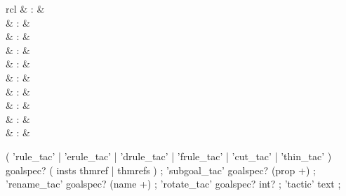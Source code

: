 \begin{isabellebody}
\begin{isamarkuptext}
  \begin{matharray}{rcl}
    \mbox{}\isa{{\isachardoublequote}\isactrlsup {\isacharasterisk}{\isachardoublequote}} & : & \isarmeth \\
    \mbox{}\isa{{\isachardoublequote}\isactrlsup {\isacharasterisk}{\isachardoublequote}} & : & \isarmeth \\
    \mbox{}\isa{{\isachardoublequote}\isactrlsup {\isacharasterisk}{\isachardoublequote}} & : & \isarmeth \\
    \mbox{}\isa{{\isachardoublequote}\isactrlsup {\isacharasterisk}{\isachardoublequote}} & : & \isarmeth \\
    \mbox{}\isa{{\isachardoublequote}\isactrlsup {\isacharasterisk}{\isachardoublequote}} & : & \isarmeth \\
    \mbox{}\isa{{\isachardoublequote}\isactrlsup {\isacharasterisk}{\isachardoublequote}} & : & \isarmeth \\
    \mbox{}\isa{{\isachardoublequote}\isactrlsup {\isacharasterisk}{\isachardoublequote}} & : & \isarmeth \\
    \mbox{}\isa{{\isachardoublequote}\isactrlsup {\isacharasterisk}{\isachardoublequote}} & : & \isarmeth \\
    \mbox{}\isa{{\isachardoublequote}\isactrlsup {\isacharasterisk}{\isachardoublequote}} & : & \isarmeth \\
    \mbox{}\isa{{\isachardoublequote}\isactrlsup {\isacharasterisk}{\isachardoublequote}} & : & \isarmeth \\
  \end{matharray}

  \begin{rail}
    ( 'rule\_tac' | 'erule\_tac' | 'drule\_tac' | 'frule\_tac' | 'cut\_tac' | 'thin\_tac' ) goalspec?
    ( insts thmref | thmrefs )
    ;
    'subgoal\_tac' goalspec? (prop +)
    ;
    'rename\_tac' goalspec? (name +)
    ;
    'rotate\_tac' goalspec? int?
    ;
    'tactic' text
    ;


\end{rail}
\end{isamarkuptext}
\end{isabellebody}
